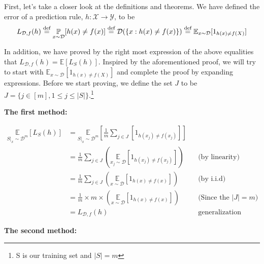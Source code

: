 \documentclass[]{book}
\theoremstyle{definition}
\begin{document}
  \vspace{0.5cm}
  
  First, let's take a closer look at the definitions and theorems. We have defined the error of a prediction rule, $h:\mathcal{X} \rightarrow  \mathcal{Y}$, to be
  \begin{equation*}
      L_{\mathcal{D},f}(h) \overset{\textup{def}}{=}  \underset{x \sim \mathcal{D}}{\mathbb{P}}[h(x)\neq f(x)] \overset{\textup{def}}{=} \mathcal{D}(\{x:h(x) \neq f(x)\})\overset{\textup{def}}{=}\mathbb{E}_{x \sim \mathcal{D}}[1_{h(x)\neq f(X)}]
  \end{equation*}
  
  In addition, we have proved by the right most expression of the above equalities that $L_{\mathcal{D},f}(h)=\mathbb{E}[L_S(h)]$.
  Inspired by the aforementioned proof, we will try to start with $\mathbb{E}_{x \sim \mathcal{D}}[1_{h(x)\neq f(X)}]$ and complete the proof by expanding expressions.
  Before we start proving, we define the set $J$ to be $J=\{j\in [m] ,1\leq j \leq |S|\}$.\footnote{S is our training set and $|S|=m$}
  
  
   \textbf{The first method:}
  
  \begin{align*}
      \underset{S|_x \sim \mathcal{D}^m}{\mathbb{E}}[L_S(h)] & =\underset{S|_x \sim \mathcal{D}^m}{\mathbb{E}}\left [\frac{1}{m}\sum_{j\in J}[1_{h(x_j)\neq f(x_j)}]\right ] \\
     & =\frac{1}{m}\sum_{j\in J} \left ( \underset{x_j \sim \mathcal{D}}{\mathbb{E}}\left [1_{h(x_j)\neq f(x_j)}\right ] \right ) && \text{(by linearity)}
     \\
     & =\frac{1}{m}\sum_{j\in J} \left ( \underset{x \sim \mathcal{D}}{\mathbb{E}}\left [1_{h(x)\neq f(x)}\right ] \right ) && \text{(by i.i.d)}
      \\
     & =\frac{1}{m} \times m \times \left ( \underset{x \sim \mathcal{D}}{\mathbb{E}}\left [1_{h(x)\neq f(x)}\right ] \right ) && \text{(Since the $|J|=m$)}
     \\
     &= L_{\mathcal{D},f}(h) && \text{generalization error}
  \end{align*}
  
     \textbf{The second method:}
     
\end{document}
